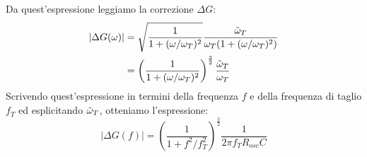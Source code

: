 \documentclass{article}[a4paper, oneside,11pt]
\begin{document}
    Da quest'espressione leggiamo la correzione $\Delta G$:
    \begin{align*}
    |\Delta G(\omega)| &= \sqrt{\frac{1}{1+(\omega/\omega_T)^2}} \frac{\Tilde{\omega}_T}{\omega_T(1+(\omega/\omega_T)^2)}\\  
    &= \left(\frac{1}{1+(\omega/\omega_T)^2}\right)^{\frac{3}{2}} \frac{\Tilde{\omega}_T}{\omega_T}
    \end{align*}
    Scrivendo quest'espressione in termini della frequenza $f$ e della frequenza di taglio $f_T$ ed esplicitando $\Tilde{\omega}_T$, otteniamo l'espressione:
    \[|\Delta G(f)|= \left(\frac{1}{1+f^2/f_T^2}\right)^{\frac{3}{2}} \frac{1}{2\pi f_TR_{osc}C}\]
\end{document}
